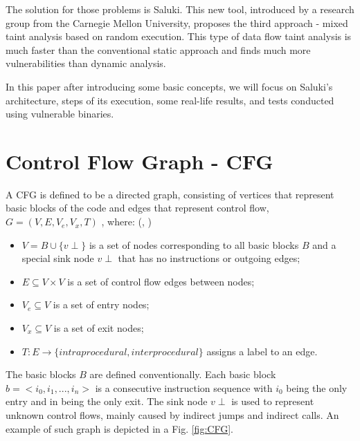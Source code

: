 \documentclass[a4paper, 12pt, journal, onecolumn]{IEEEtran}
\begin{document}
The solution for those problems is Saluki. This new tool, introduced by a research group from the Carnegie Mellon University, proposes the third approach - mixed taint analysis based on random execution. This type of data flow taint analysis is much faster than the conventional static approach and finds much more vulnerabilities than dynamic analysis.\cite{saluki} 

In this paper after introducing some basic concepts, we will focus on Saluki's architecture, steps of its execution, some real-life results, and tests conducted using vulnerable binaries.
\pagebreak


\section{Control Flow Graph - CFG}

A CFG is defined to be a directed graph, consisting of vertices that represent basic blocks of the code and edges that represent control flow, $G = (V,E,V_e,V_x,T)$ , where: (\cite{CFG}, \cite{binaries})
\begin{itemize}
    \item $V = B ∪ \{v\perp\}$ is a set of nodes corresponding to all basic blocks $B$ and a special sink node $v\perp$ that has no instructions or outgoing edges;
    \item $E \subseteq V \times V$ is a set of control flow edges between nodes; 
    \item $V_e \subseteq V$ is a set of entry nodes;
    \item $V_x \subseteq V$ is a set of exit nodes;
    \item $ T : E \rightarrow \{intraprocedural, interprocedural\} $ assigns a label to an edge.

\end{itemize}
The basic blocks $B$ are defined conventionally. Each basic block $ b =< i_0, i_1, . . . , i_n > $ is a consecutive instruction sequence with $i_0$ being the only entry and in being the only exit. The sink node $v\perp$ is used to represent unknown control flows, mainly caused by indirect jumps and indirect calls.\cite{CFG2} An example of such graph is depicted in a Fig. \ref{fig:CFG}.
\end{document}
